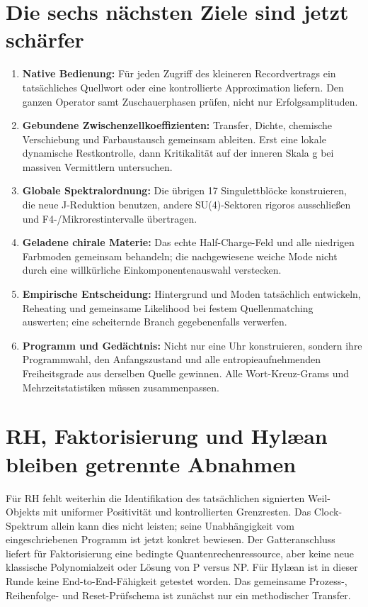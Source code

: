 \section{Die sechs nächsten Ziele sind jetzt schärfer}
\begin{enumerate}
\item \textbf{Native Bedienung:} Für jeden Zugriff des kleineren Recordvertrags ein tatsächliches Quellwort oder eine kontrollierte Approximation liefern. Den ganzen Operator samt Zuschauerphasen prüfen, nicht nur Erfolgsamplituden.
\item \textbf{Gebundene Zwischenzellkoeffizienten:} Transfer, Dichte, chemische Verschiebung und Farbaustausch gemeinsam ableiten. Erst eine lokale dynamische Restkontrolle, dann Kritikalität auf der inneren Skala g bei massiven Vermittlern untersuchen.
\item \textbf{Globale Spektralordnung:} Die übrigen 17 Singulettblöcke konstruieren, die neue J-Reduktion benutzen, andere SU(4)-Sektoren rigoros ausschließen und F4-/Mikrorestintervalle übertragen.
\item \textbf{Geladene chirale Materie:} Das echte Half-Charge-Feld und alle niedrigen Farbmoden gemeinsam behandeln; die nachgewiesene weiche Mode nicht durch eine willkürliche Einkomponentenauswahl verstecken.
\item \textbf{Empirische Entscheidung:} Hintergrund und Moden tatsächlich entwickeln, Reheating und gemeinsame Likelihood bei festem Quellenmatching auswerten; eine scheiternde Branch gegebenenfalls verwerfen.
\item \textbf{Programm und Gedächtnis:} Nicht nur eine Uhr konstruieren, sondern ihre Programmwahl, den Anfangszustand und alle entropieaufnehmenden Freiheitsgrade aus derselben Quelle gewinnen. Alle Wort-Kreuz-Grams und Mehrzeitstatistiken müssen zusammenpassen.
\end{enumerate}

\section{RH, Faktorisierung und Hylæan bleiben getrennte Abnahmen}
Für RH fehlt weiterhin die Identifikation des tatsächlichen signierten Weil-Objekts mit uniformer Positivität und kontrollierten Grenzresten. Das Clock-Spektrum allein kann dies nicht leisten; seine Unabhängigkeit vom eingeschriebenen Programm ist jetzt konkret bewiesen. Der Gatteranschluss liefert für Faktorisierung eine bedingte Quantenrechenressource, aber keine neue klassische Polynomialzeit oder Lösung von P versus NP. Für Hylæan ist in dieser Runde keine End-to-End-Fähigkeit getestet worden. Das gemeinsame Prozess-, Reihenfolge- und Reset-Prüfschema ist zunächst nur ein methodischer Transfer.

